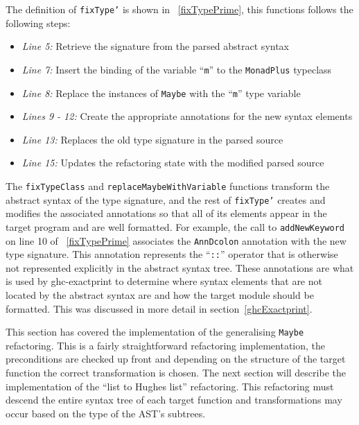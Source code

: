 The definition of \texttt{fixType'} is shown in \DIFdelbegin {}\DIFdelend \DIFaddbegin {}\DIFaddend ~\ref{fixTypePrime}, this functions follows the following steps:

\begin{itemize}
\item \textit{Line 5:} Retrieve the signature from the parsed abstract syntax
\item \textit{Line 7:} Insert the binding of the variable ``\texttt{m}'' to the \texttt{MonadPlus} typeclass
\item \textit{Line 8:} Replace the instances of \texttt{Maybe} with the ``\texttt{m}'' type variable
\item \textit{Lines 9 - 12:} Create the appropriate annotations for the new syntax elements
\item \textit{Line 13:} Replaces the old type signature in the parsed source
\item \textit{Line 15:} Updates the refactoring state with the modified parsed source
\end{itemize}

The \texttt{fixTypeClass} and \texttt{replaceMaybeWithVariable} functions transform the abstract syntax of the type signature, and the rest of \texttt{fixType'} creates and modifies the associated annotations so that all of its elements appear in the target program and are well formatted. For example, the call to \texttt{addNewKeyword} on line 10 of \DIFdelbegin {}\DIFdelend \DIFaddbegin {}\DIFaddend ~\ref{fixTypePrime} associates the \texttt{AnnDcolon} annotation with the new type signature. This annotation represents the ``\texttt{::}'' operator that is otherwise not represented explicitly in the abstract syntax tree. These annotations are what is used by ghc-exactprint to determine where syntax elements that are not located by the abstract syntax are and how the target module should be formatted. This was discussed in more detail in section~\ref{ghcExactprint}.

This section has covered the implementation of the generalising \texttt{Maybe} refactoring. This is a fairly straightforward refactoring implementation, the preconditions are checked up front and depending on the structure of the target function the correct transformation is chosen. The next section will describe the implementation of the ``list to Hughes list'' refactoring. This refactoring must descend the entire syntax tree of each target function and transformations may occur based on the type of the AST's subtrees.  

